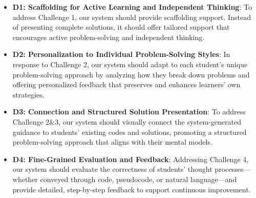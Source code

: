 \begin{itemize}
    \item \textbf{D1: Scaffolding for Active Learning and Independent Thinking}: To address Challenge 1, our system should provide scaffolding support. Instead of presenting complete solutions, it should offer tailored support that encourages active problem-solving and independent thinking.
    
    \item \textbf{D2: Personalization to Individual Problem-Solving Styles}: In response to Challenge 2, our system should adapt to each student's unique problem-solving approach by analyzing how they break down problems and offering personalized feedback that preserves and enhances learners' own strategies.

    \item \textbf{D3: Connection and Structured Solution Presentation}: To address Challenge 2\&3, our system should visually connect the system-generated guidance to students’ existing codes and solutions, promoting a structured problem-solving approach that aligns with their mental models.

    \item \textbf{D4: Fine-Grained Evaluation and Feedback}: Addressing Challenge 4, our system should evaluate the correctness of students' thought processes—whether conveyed through code, pseudocode, or natural language—and provide detailed, step-by-step feedback to support continuous improvement.
\end{itemize}





